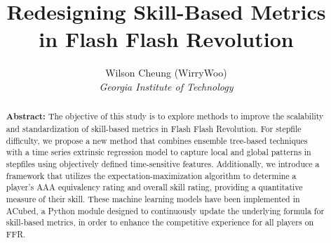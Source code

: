 \documentclass[10pt,a4paper]{scrartcl}
\begin{document}
\title{Redesigning Skill-Based Metrics \\ in Flash Flash Revolution}
\author{Wilson Cheung (WirryWoo)\\
\textit{Georgia Institute of Technology}}
\date{\vspace{-3ex}}

\maketitle %




\begin{abstract}
	\normalsize
	\textbf{Abstract:} The objective of this study is to explore methods to improve the scalability and standardization of skill-based metrics in Flash Flash Revolution. For stepfile difficulty, we propose a new method that combines ensemble tree-based techniques with a time series extrinsic regression model to capture local and global patterns in stepfiles using objectively defined time-sensitive features. Additionally, we introduce a framework that utilizes the expectation-maximization algorithm to determine a player's AAA equivalency rating and overall skill rating, providing a quantitative measure of their skill. These machine learning models have been implemented in ACubed, a Python module designed to continuously update the underlying formula for skill-based metrics, in order to enhance the competitive experience for all players on FFR.
\end{abstract}

\setcounter{tocdepth}{2}
\tableofcontents


\clearpage








\clearpage




\printbibliography
\end{document}
